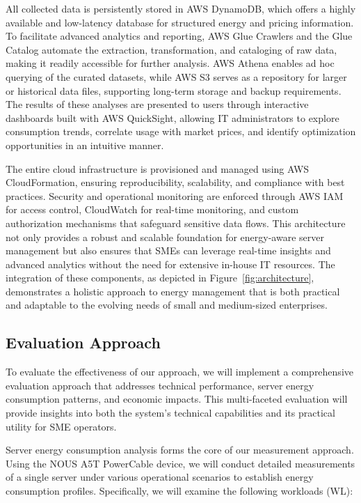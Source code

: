 All collected data is persistently stored in AWS DynamoDB, which offers a highly available and low-latency database for structured energy and pricing information. To facilitate advanced analytics and reporting, AWS Glue Crawlers and the Glue Catalog automate the extraction, transformation, and cataloging of raw data, making it readily accessible for further analysis. AWS Athena enables ad hoc querying of the curated datasets, while AWS S3 serves as a repository for larger or historical data files, supporting long-term storage and backup requirements. The results of these analyses are presented to users through interactive dashboards built with AWS QuickSight, allowing IT administrators to explore consumption trends, correlate usage with market prices, and identify optimization opportunities in an intuitive manner.

The entire cloud infrastructure is provisioned and managed using AWS CloudFormation, ensuring reproducibility, scalability, and compliance with best practices. Security and operational monitoring are enforced through AWS IAM for access control, CloudWatch for real-time monitoring, and custom authorization mechanisms that safeguard sensitive data flows. This architecture not only provides a robust and scalable foundation for energy-aware server management but also ensures that SMEs can leverage real-time insights and advanced analytics without the need for extensive in-house IT resources. The integration of these components, as depicted in Figure~\ref{fig:architecture}, demonstrates a holistic approach to energy management that is both practical and adaptable to the evolving needs of small and medium-sized enterprises.

\subsection{Evaluation Approach}
\label{methodology:evaluation-approach}
To evaluate the effectiveness of our approach, we will implement a comprehensive
evaluation approach that addresses technical performance, server energy
consumption patterns, and economic impacts. This multi-faceted evaluation will
provide insights into both the system's technical capabilities and its practical
utility for SME operators.

Server energy consumption analysis forms the core of our measurement approach.
Using the NOUS A5T PowerCable device, we will conduct detailed measurements of a
single server under various operational scenarios to establish energy consumption
profiles. Specifically, we will examine the following workloads (WL):

